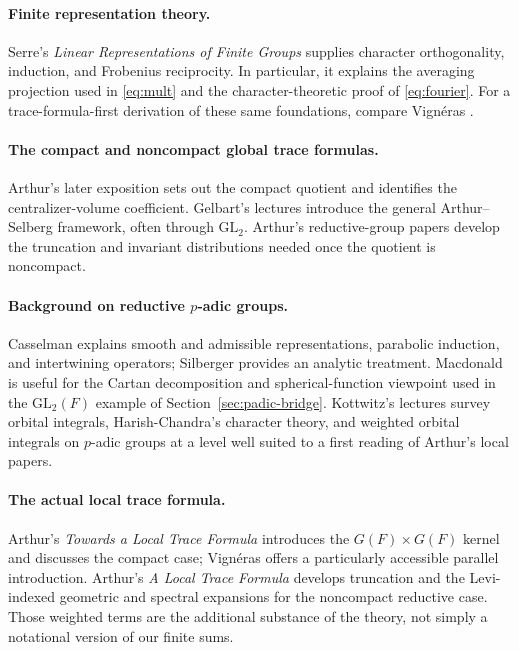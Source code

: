 \documentclass[12pt]{article}
\theoremstyle{remark}
\begin{document}
\paragraph{Finite representation theory.}
Serre's \emph{Linear Representations of Finite Groups} \cite{Serre}
supplies character orthogonality, induction, and Frobenius reciprocity.
In particular, it explains the averaging projection used in
\eqref{eq:mult} and the character-theoretic proof of
\eqref{eq:fourier}. For a trace-formula-first derivation
of these same foundations, compare Vign\'eras \cite[\S1]{Vigneras1991}.

\paragraph{The compact and noncompact global trace formulas.}
Arthur's later exposition \cite[Part~I, \S1]{ArthurIntro2005}
sets out the compact quotient and identifies the
centralizer-volume coefficient. Gelbart's lectures \cite{Gelbart1996}
introduce the general Arthur--Selberg framework, often through
$\mathrm{GL}_2$. Arthur's reductive-group papers
\cite{Arthur1978,Arthur1980,ArthurInvariant1981} develop the
truncation and invariant distributions needed once the quotient
is noncompact.

\paragraph{Background on reductive $p$-adic groups.}
Casselman \cite{Casselman1995} explains smooth and admissible
representations, parabolic induction, and intertwining operators;
Silberger \cite{Silberger1979} provides an analytic treatment.
Macdonald \cite{Macdonald1971} is useful for the Cartan
decomposition and spherical-function viewpoint used in the
$\mathrm{GL}_2(F)$ example of Section~\ref{sec:padic-bridge}.
Kottwitz's lectures \cite{Kottwitz2005} survey orbital integrals,
Harish-Chandra's character theory, and weighted orbital integrals
on $p$-adic groups at a level well suited to a first reading of
Arthur's local papers.

\paragraph{The actual local trace formula.}
Arthur's \emph{Towards a Local Trace Formula}
\cite[\S\S1--2]{ArthurTowards1989} introduces the $G(F)\times G(F)$
kernel and discusses the compact case; Vign\'eras
\cite[\S2]{Vigneras1991} offers a particularly accessible
parallel introduction. Arthur's \emph{A Local Trace Formula}
\cite{ArthurLocal1991} develops truncation and the
Levi-indexed geometric and spectral expansions for the
noncompact reductive case. Those weighted terms are the
additional substance of the theory, not simply a notational
version of our finite sums.
\end{document}
